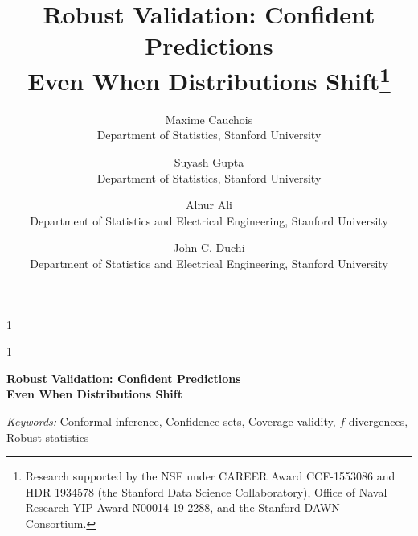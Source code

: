 \documentclass[12pt]{article}
\newcommand{\blind}{1}
\begin{document}
%

\def\spacingset#1{\renewcommand{\baselinestretch}%
{#1}\small\normalsize} \spacingset{1}



\blind
{
  \title{\bf Robust Validation: Confident Predictions \\
  Even When Distributions Shift\thanks{
    Research supported by the NSF under CAREER Award CCF-1553086
    and HDR 1934578 (the Stanford Data Science Collaboratory),
    Office of Naval Research YIP Award N00014-19-2288,
    and the Stanford DAWN Consortium.}}
  \author{
  	Maxime Cauchois \\Department of Statistics, Stanford University
    \and Suyash Gupta \\
    Department of Statistics, Stanford University
    \and Alnur Ali \\
    Department of Statistics and Electrical Engineering, Stanford University
    \and  John C. Duchi \\
    Department of Statistics and Electrical Engineering, Stanford University
    }
  \maketitle
} \fi

\blind
{
  \bigskip
  \bigskip
  \bigskip
  \begin{center}
    {\Large \bf Robust Validation: Confident Predictions \\
  Even When Distributions Shift}
\end{center}
  \medskip
} \fi

\bigskip


\noindent%
{\it Keywords:}  Conformal inference, Confidence sets, Coverage validity, $f$-divergences, Robust statistics
\vfill

\newpage
\spacingset{1.9} %











\end{document}
